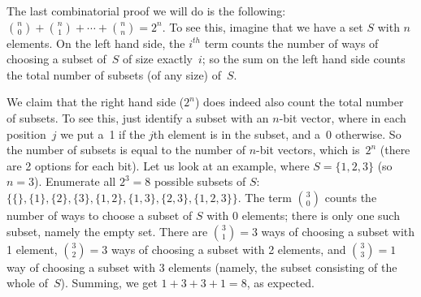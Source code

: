 \documentclass[11pt,fleqn]{article}
\begin{document}
The last combinatorial proof we will do is the following: ${n \choose
0} + {n \choose 1} + \cdots + {n \choose n} = 2^n$. To see this,
imagine that we have a set $S$ with $n$ elements.  On the left hand
side, the $i^{th}$ term counts the number of ways of choosing a
subset of~$S$ of size exactly~$i$; so the sum on the left hand side
counts the total number of subsets (of any size) of~$S$.

We claim that the right hand side ($2^n$) does indeed also count the total
number of subsets.  To see this, just identify a subset with an $n$-bit
vector, where in each position~$j$ we put a~1 if the $j$th element is in
the subset, and a~0 otherwise.  So the number of subsets is equal to
the number of $n$-bit vectors, which is~$2^n$ (there are 2 options for
each bit).  Let us look at
an example, where $S = \{1,2,3\}$ (so $n=3$).  Enumerate all
$2^3 = 8$ possible subsets of $S$:
$\{\{\},\{1\},\{2\},\{3\},\{1,2\},\{1,3\},\{2,3\},\{1,2,3\}\}$. The
term ${3 \choose 0}$ counts the number of ways to choose a subset of
$S$ with 0 elements; there is only one such subset, namely the empty
set. There are ${3\choose 1}=3$ ways of choosing a subset with 1 element,
${3\choose 2}=3$ ways of choosing
a subset with 2 elements, and ${3\choose 3}=1$
way of choosing a subset with 3 elements (namely, the subset consisting
of the whole of~$S$).  Summing, we get $1+3+3+1 = 8$, as expected.
\end{document}
